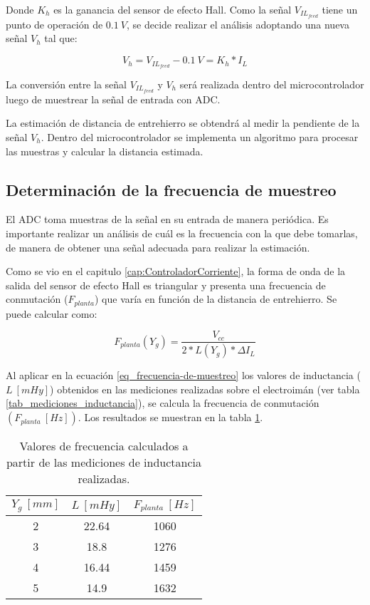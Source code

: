 Donde $K_h$ es la ganancia del sensor de efecto Hall. Como la señal $V_{IL_{feed}}$ tiene un punto de operación de $0.1\:V$, se decide realizar el análisis adoptando una nueva señal $V_h$ tal que:

\begin{equation*}
	V_h=V_{IL_{feed}}-0.1\:V=K_h*I_L
\end{equation*}


La conversión entre la señal $V_{IL_{feed}}$ y $V_h$ será realizada dentro del microcontrolador luego de muestrear la señal de entrada con ADC.

La estimación de distancia de entrehierro se obtendrá al medir la pendiente de la señal $V_h$. Dentro del microcontrolador se implementa un algoritmo para procesar las muestras y calcular la distancia estimada. 

\subsection{Determinación de la frecuencia de muestreo}

El ADC toma muestras de la señal en su entrada de manera periódica. Es importante realizar un análisis de cuál es la frecuencia con la que debe tomarlas, de manera de obtener una señal adecuada para realizar la estimación.

Como se vio en el capitulo \ref{cap:ControladorCorriente}, la forma de onda de la salida del sensor de efecto Hall es triangular y presenta una frecuencia de conmutación ($F_{planta}$) que varía en función de la distancia de entrehierro. Se puede calcular como:

\begin{equation} \label{eq_frecuencia-de-muestreo}
	F_{planta}(Y_g)=\frac{V_{cc}}{2 * L(Y_g) * \Delta I_L}
\end{equation}


Al aplicar en la ecuación \ref{eq_frecuencia-de-muestreo} los valores de inductancia ($L\:[mHy]$) obtenidos en las mediciones realizadas sobre el electroimán (ver tabla \ref{tab_mediciones_inductancia}), se calcula la frecuencia de conmutación  $(F_{planta}\:[Hz])$. Los resultados se muestran en la tabla \ref{frecuencias-calculadas}.



\begin{table}[H]
	\begin{center}
		\begin{tabular}{| c | c | c |}
			\hline
			$Y_g\:[mm]$ & $L\:[mHy]$ & $F_{planta}\:[Hz]$\\ \hline
			2 & 22.64 & 1060\\ \hline
			3 & 18.8 & 1276\\ \hline
			4 & 16.44 & 1459\\ \hline
			5 & 14.9 & 1632\\ \hline
		\end{tabular}
		\caption{Valores de frecuencia calculados a partir de las mediciones de inductancia realizadas.}
		\label{frecuencias-calculadas}
	\end{center}
\end{table}


